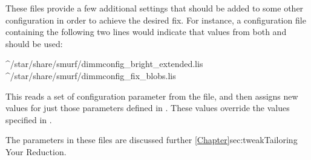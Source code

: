 These files provide a few additional settings that should be added to
some other configuration in order to achieve the desired fix. For
instance, a configuration file containing the following two lines would
indicate that values from both  and
 should be used:

\begin{terminalv}
^/star/share/smurf/dimmconfig_bright_extended.lis
^/star/share/smurf/dimmconfig_fix_blobs.lis
\end{terminalv}

This reads a set of configuration parameter from the
 file, and then assigns new values for just
those parameters defined in . These values override
the values specified in .

The parameters in these files are discussed further
\cref{Chapter}{sec:tweak}{Tailoring Your Reduction}.



